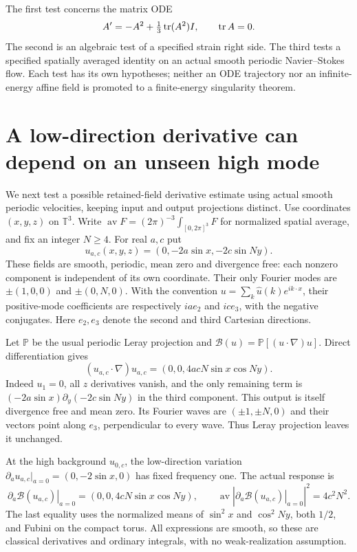 \documentclass[11pt]{article}
\begin{document}
The first test concerns the matrix ODE
\begin{equation}\label{eq:RE}
 A'=-A^2+\tfrac13\operatorname{tr}(A^2)I,\qquad \operatorname{tr} A=0.
\end{equation}
The second is an algebraic test of a specified strain right side. The
third tests a specified spatially averaged identity on an actual smooth
periodic Navier--Stokes flow. Each test has its own hypotheses; neither
an ODE trajectory nor an infinite-energy affine field is promoted to a
finite-energy singularity theorem.


\section{A low-direction derivative can depend on an unseen high mode}
We next test a possible retained-field derivative estimate using actual
smooth periodic velocities, keeping input and output projections distinct.
Use coordinates $(x,y,z)$ on $\mathbb T^3$. Write
$\operatorname{av} F=(2\pi)^{-3}\int_{[0,2\pi]^3}F$ for normalized
spatial average, and fix an integer $N\geq4$. For real $a,c$ put
\[
 u_{a,c}(x,y,z)=(0,-2a\sin x,-2c\sin Ny).
\]
These fields are smooth, periodic, mean zero and divergence free: each
nonzero component is independent of its own coordinate. Their only
Fourier modes are $\pm(1,0,0)$ and $\pm(0,N,0)$. With the convention
$u=\sum_k\widehat u(k)e^{ik\cdot x}$, their positive-mode coefficients
are respectively $ia e_2$ and $ic e_3$, with the negative conjugates.
Here $e_2,e_3$ denote the second and third Cartesian directions.

Let $\mathbb P$ be the usual periodic Leray projection and
$\mathcal B(u)=\mathbb P[(u\cdot\nabla)u]$. Direct differentiation gives
\begin{equation}\label{eq:highlowadvection}
 (u_{a,c}\cdot\nabla)u_{a,c}
 =(0,0,4acN\sin x\cos Ny).
\end{equation}
Indeed $u_1=0$, all $z$ derivatives vanish, and the only remaining
term is $(-2a\sin x)\partial_y(-2c\sin Ny)$ in the third component.
This output is itself divergence free and mean zero. Its Fourier
waves are $(\pm1,\pm N,0)$ and their vectors point along $e_3$,
perpendicular to every wave. Thus Leray projection leaves it unchanged.

At the high background $u_{0,c}$, the low-direction variation
$\partial_a u_{a,c}|_{a=0}=(0,-2\sin x,0)$ has fixed frequency one.
The actual response is
\begin{equation}\label{eq:highlowderivative}
 \left.\partial_a\mathcal B(u_{a,c})\right|_{a=0}
 =(0,0,4cN\sin x\cos Ny),\qquad
 \operatorname{av}\left|\left.\partial_a\mathcal B(u_{a,c})\right|_{a=0}\right|^2
 =4c^2N^2.
\end{equation}
The last equality uses the normalized means of $\sin^2x$ and
$\cos^2Ny$, both $1/2$, and Fubini on the compact torus.
All expressions are smooth, so these are classical derivatives and
ordinary integrals, with no weak-realization assumption.
\end{document}
